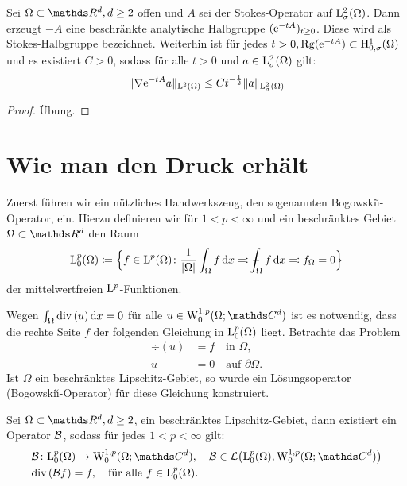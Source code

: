 \begin{thm}
  Sei $\Omega \subset \R^d, d \geq 2$ offen und $A$ sei der Stokes-Operator auf $\mathrm{L}^2_\sigma(\Omega)$.
  Dann erzeugt $-A$ eine beschränkte analytische Halbgruppe $(\mathrm{e}^{-tA})_{t \geq 0}$.
  Diese wird als Stokes-Halbgruppe bezeichnet.
  Weiterhin ist für jedes $t > 0, \operatorname{Rg}(\mathrm{e}^{-tA}) \subset \mathrm{H}_{0,\sigma}^1(\Omega)$ und es existiert $C > 0$, sodass für alle $t > 0$ und $a \in \mathrm{L}_\sigma^2(\Omega)$ gilt:
  $$
  \|\nabla \mathrm{e}^{-tA} a \|_{\mathrm{L}^2(\Omega)} \leq C t^{-\frac{1}{2}} \|a\|_{\mathrm{L}_\sigma^2(\Omega)}
  $$
\end{thm}

\begin{proof}
  Übung.
\end{proof}

\section{Wie man den Druck erhält}

Zuerst führen wir ein nützliches Handwerkszeug, den sogenannten Bogowski\u{\i}-Operator, ein.
Hierzu definieren wir für $1 < p < \infty$ und ein beschränktes Gebiet $\Omega \subset \R^d$ den Raum
$$
\Ell^p_0(\Omega) \coloneqq \Big\{ f \in \Ell^p(\Omega) \colon \frac{1}{|\Omega|} \int_\Omega f \d x \eqqcolon \dashint_\Omega f \d x \eqqcolon f_\Omega = 0 \Big\}
$$
der mittelwertfreien $\mathrm{L}^p$-Funktionen.

Wegen $\int_\Omega \mathrm{div\,} (u) \, {\operatorname{d}\!{x}} = 0$ für alle $u \in \WW_0^{1,p}(\Omega; \C^d)$ ist es notwendig, dass die rechte Seite $f$ der folgenden Gleichung in $\mathrm{L}^p_0(\Omega)$ liegt.
Betrachte das Problem
\begin{align*}
  \div(u) &= f \quad\text{in } \Omega, \\
  u &= 0 \quad\text{auf } \partial \Omega.
\end{align*}
Ist $\Omega$ ein beschränktes Lipschitz-Gebiet, so wurde ein Lösungsoperator (Bogowski\u{\i}-Operator) für diese Gleichung konstruiert.

\begin{thm}
  \label{thm:bogowskii}
  Sei $\Omega \subset \R^d, d \geq 2$, ein beschränktes Lipschitz-Gebiet, dann existiert ein Operator $\mathcal{B}$, sodass für jedes $1 < p < \infty$ gilt:
  \begin{align*}
    &\Bog \colon \Ell_0^p(\Omega) \to \WW_0^{1,p}(\Omega; \C^d), \quad \Bog \in \Li\big(\Ell_0^p(\Omega), \WW_0^{1,p}(\Omega; \C^d)\big) \\
    &\div(\Bog f) = f, \quad\text{für alle } f \in \Ell_0^p(\Omega).
  \end{align*}
\end{thm}

